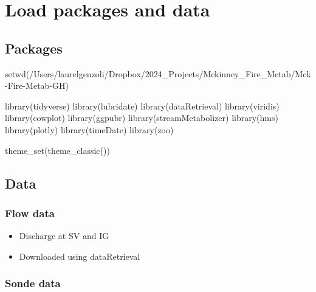 \documentclass[
  letterpaper,
  DIV=11,
  numbers=noendperiod]{scrartcl}
\newenvironment{Shaded}{\begin{snugshade}}{\end{snugshade}}
\newcommand{\FunctionTok}[1]{\textcolor[rgb]{0.28,0.35,0.67}{#1}}
\newcommand{\NormalTok}[1]{\textcolor[rgb]{0.00,0.23,0.31}{#1}}
\newcommand{\StringTok}[1]{\textcolor[rgb]{0.13,0.47,0.30}{#1}}
\providecommand{\tightlist}{%
  \setlength{\itemsep}{0pt}\setlength{\parskip}{0pt}}\usepackage{longtable,booktabs,array}
\begin{document}
\section{Load packages and data}\label{load-packages-and-data}

\subsection{Packages}\label{packages}

\begin{Shaded}
\begin{Highlighting}[]
\FunctionTok{setwd}\NormalTok{(}\StringTok{\textquotesingle{}/Users/laurelgenzoli/Dropbox/2024\_Projects/Mckinney\_Fire\_Metab/Mck{-}Fire{-}Metab{-}GH\textquotesingle{}}\NormalTok{)}

\FunctionTok{library}\NormalTok{(tidyverse)}
\FunctionTok{library}\NormalTok{(lubridate)}
\FunctionTok{library}\NormalTok{(dataRetrieval)}
\FunctionTok{library}\NormalTok{(viridis)}
\FunctionTok{library}\NormalTok{(cowplot)}
\FunctionTok{library}\NormalTok{(ggpubr)}
\FunctionTok{library}\NormalTok{(streamMetabolizer)}
\FunctionTok{library}\NormalTok{(hms)}
\FunctionTok{library}\NormalTok{(plotly)}
\FunctionTok{library}\NormalTok{(timeDate)}
\FunctionTok{library}\NormalTok{(zoo)}

\FunctionTok{theme\_set}\NormalTok{(}\FunctionTok{theme\_classic}\NormalTok{())}
\end{Highlighting}
\end{Shaded}

\subsection{Data}\label{data}

\subsubsection{Flow data}\label{flow-data}

\begin{itemize}
\tightlist
\item
  Discharge at SV and IG
\item
  Downloaded using dataRetrieval
\end{itemize}

\small

\normalsize

\subsubsection{Sonde data}\label{sonde-data}
\end{document}
